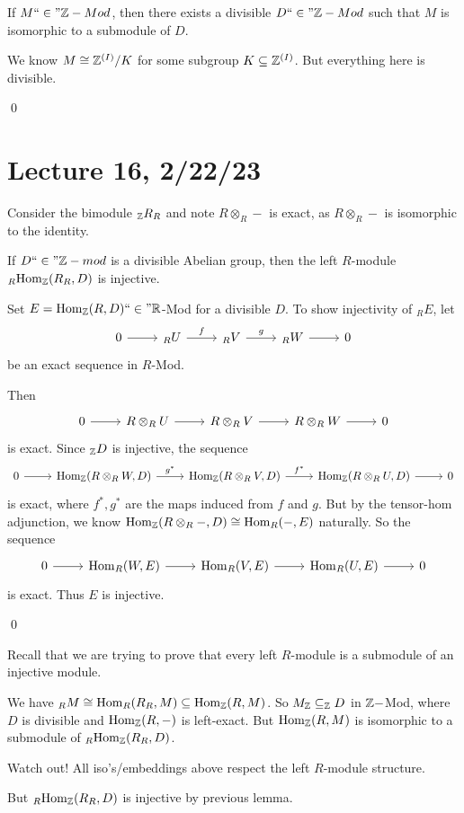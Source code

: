 \documentclass[x11names,reqno,14pt]{extarticle}
\newcommand{\fin}{``\in"}
\begin{document}
If $M \fin \Z-Mod$, then there exists a divisible $D \fin \Z-Mod$ such that $M$ is isomorphic to a submodule of $D$. 

\proof

We know $M \cong \mathbb{Z}^{(I)}/K$ for some subgroup $K \subseteq \mathbb{Z}^{(I)}$. But everything here is divisible. 

\qed

\section*{Lecture 16, 2/22/23}

Consider the bimodule $_{\mathbb{Z}} R_R$ and note $R\otimes_R-$ is exact, as $R\otimes_R-$ is isomorphic to the identity. 

\lem

If $D \fin\Z-mod$ is a divisible Abelian group, then the left $R$-module $_R{\mathrm{Hom}}_{\mathbb{Z}}(R_R, D)$ is injective.

\proof

Set $E = \Hom_{\Z}(R, D)\fin\R$-Mod for a divisible $D$. To show injectivity of $_RE$, let
\[
\exactshort{_RU}{f}{_RV}{g}{_RW}
\]
be an exact sequence in $R$-Mod.

Then
\[
\exactshort{R\otimes_RU}{}{R\otimes_RV}{}{R\otimes_RW}
\]
is exact. Since $_{\mathbb{Z}} D$ is injective, the sequence
\[
\exactshort{\Hom_\Z(R\otimes_RW,D)}{g^*}{\Hom_\Z(R\otimes_RV, D)}{f^*}{\Hom_\Z(R\otimes_RU, D)}
\]
is exact, where $f^*, g^*$ are the maps induced from $f$ and $g$. But by the tensor-hom adjunction, we know ${\mathrm{Hom}}_{\mathbb{Z}}(R\otimes_R-, D) \cong {\mathrm{Hom}}_R(-, E)$ naturally. So the sequence
\[
\begin{tikzcd}
0\ar[r]&\Hom_R(W, E) \ar[r]&\Hom_R(V, E)\ar[r]&\Hom_R(U, E)\ar[r]&0
\end{tikzcd}
\]
is exact. Thus $E$ is injective.

\qed

Recall that we are trying to prove that every left $R$-module is a submodule of an injective module. 

\proof

We have $_RM\cong{\mathrm{Hom}}_R(R_R, M)\subseteq{\mathrm{Hom}}_{\mathbb{Z}}(R, M)$. So $M_{\mathbb{Z}}\subseteq_{\mathbb{Z}} D$ in $\mathbb{Z}-$Mod, where $D$ is divisible and ${\mathrm{Hom}}_{\mathbb{Z}}(R, -)$ is left-exact. But ${\mathrm{Hom}}_{\mathbb{Z}}(R, M)$ is isomorphic to a submodule of $_R{\mathrm{Hom}}_{\mathbb{Z}}(R_R, D)$.
\dbend

Watch out! All iso's/embeddings above respect the left $R$-module structure. 

But $_R{\mathrm{Hom}}_{\mathbb{Z}}(R_R,D)$ is injective by previous lemma.
\end{document}
